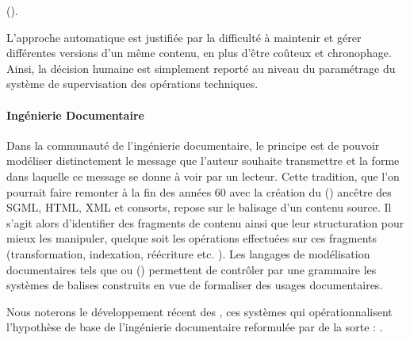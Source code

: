  (\cite{Singh2004}).

L'approche automatique est justifiée par la difficulté à maintenir et gérer différentes versions d'un même contenu, en plus d'être coûteux et chronophage.
Ainsi, la décision humaine est simplement reporté au niveau du paramétrage du système de supervisation des opérations techniques.\\


\paragraph{Ingénierie Documentaire}
Dans la communauté de l'ingénierie documentaire, le principe est de pouvoir modéliser distinctement le message que l'auteur souhaite transmettre et la forme dans laquelle ce message se donne à voir par un lecteur. 
Cette tradition, que l'on pourrait faire remonter à la fin des années 60 avec la création du  (\cite{Goldfarb}) ancêtre des SGML, HTML, XML et consorts, repose sur le balisage d'un contenu source. 
Il s'agit alors d'identifier des fragments de contenu ainsi que leur structuration pour mieux les manipuler, quelque soit les opérations effectuées sur ces fragments (transformation, indexation, réécriture etc. \cite[chap.5.2]{Bachimont2004}). 
Les langages de modélisation documentaires tels que  ou  (\cite{Fallside2004}) permettent de contrôler par une grammaire les systèmes de balises construits en vue de formaliser des usages documentaires. 

Nous noterons le développement récent des , ces systèmes qui opérationnalisent l'hypothèse de base de l'ingénierie documentaire reformulée par \cite{Crozat2004} de la sorte : . 

